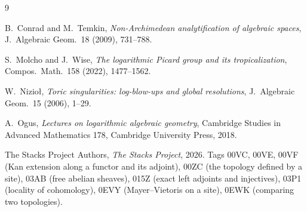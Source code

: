 \documentclass[11pt]{article}
\theoremstyle{definition}
\theoremstyle{remark}
\begin{document}
\begin{thebibliography}{9}

B.~Conrad and M.~Temkin,
\emph{Non-Archimedean analytification of algebraic spaces},
J.~Algebraic Geom.\ 18 (2009), 731--788.

S.~Molcho and J.~Wise,
\emph{The logarithmic Picard group and its tropicalization},
Compos.\ Math.\ 158 (2022), 1477--1562.

W.~Nizio{\l},
\emph{Toric singularities: log-blow-ups and global resolutions},
J.~Algebraic Geom.\ 15 (2006), 1--29.

A.~Ogus,
\emph{Lectures on logarithmic algebraic geometry},
Cambridge Studies in Advanced Mathematics 178,
Cambridge University Press, 2018.

The Stacks Project Authors,
\emph{The Stacks Project}, 2026.
Tags 00VC, 00VE, 00VF (Kan extension along a functor and its adjoint),
00ZC (the topology defined by a site),
03AB (free abelian sheaves),
015Z (exact left adjoints and injectives),
03P1 (locality of cohomology),
0EVY (Mayer--Vietoris on a site),
0EWK (comparing two topologies).

\end{thebibliography}
\end{document}
